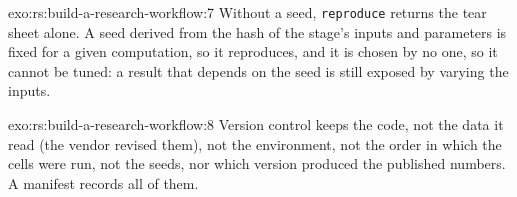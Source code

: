 \begin{solution}{exo:rs:build-a-research-workflow:7}
Without a seed, \texttt{reproduce} returns the tear sheet alone. A seed derived from the hash of the stage's inputs and parameters is fixed for a given computation,
so it reproduces, and it is chosen by no one, so it cannot be tuned: a result that depends on the seed is still exposed by varying the inputs.
\end{solution}

\begin{solution}{exo:rs:build-a-research-workflow:8}
Version control keeps the code, not the data it read (the vendor revised them), not the environment, not the order in which the cells were run, not the seeds,
nor which version produced the published numbers. A manifest records all of them.
\end{solution}

